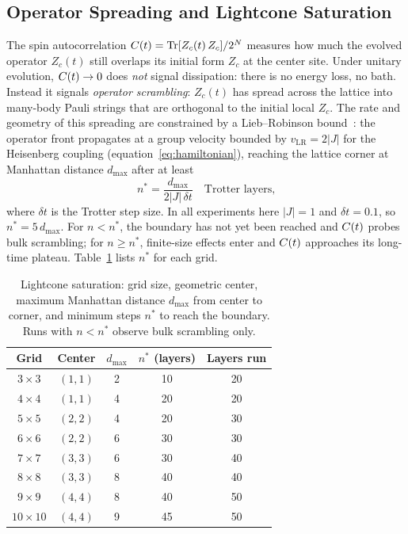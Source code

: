 \subsection{Operator Spreading and Lightcone Saturation}
\label{sec:lightcone}

The spin autocorrelation $C(t) = \mathrm{Tr}[Z_c(t)\,Z_c]/2^N$ measures how
much the evolved operator $Z_c(t)$ still overlaps its initial form $Z_c$ at
the center site.
Under unitary evolution, $C(t) \to 0$ does \emph{not} signal dissipation:
there is no energy loss, no bath.
Instead it signals \emph{operator scrambling}: $Z_c(t)$ has spread across
the lattice into many-body Pauli strings that are orthogonal to the initial
local $Z_c$.
The rate and geometry of this spreading are constrained by a Lieb--Robinson
bound~\citep{liebrobinson}: the operator front propagates at a group velocity
bounded by $v_{\mathrm{LR}} = 2|J|$ for the Heisenberg coupling
(equation~\eqref{eq:hamiltonian}), reaching the lattice corner at Manhattan
distance $d_{\mathrm{max}}$ after at least
\begin{equation}
 n^* = \frac{d_{\mathrm{max}}}{2|J|\,\delta t}
 \quad \text{Trotter layers,}
 \label{eq:nstar}
\end{equation}
where $\delta t$ is the Trotter step size.
In all experiments here $|J| = 1$ and $\delta t = 0.1$, so
$n^* = 5\,d_{\mathrm{max}}$.
For $n < n^*$, the boundary has not yet been reached and $C(t)$ probes
bulk scrambling; for $n \geq n^*$, finite-size effects enter and $C(t)$
approaches its long-time plateau.
Table~\ref{tab:lightcone} lists $n^*$ for each grid.

\begin{table}[ht]
\centering
\caption{Lightcone saturation: grid size, geometric center, maximum Manhattan
 distance $d_{\mathrm{max}}$ from center to corner, and minimum steps $n^*$
 to reach the boundary.
 Runs with $n < n^*$ observe bulk scrambling only.}
\label{tab:lightcone}
\begin{tabular}{ccccc}
\toprule
Grid & Center & $d_{\mathrm{max}}$ & $n^*$ (layers) & Layers run \\
\midrule
$3\times3$ & $(1,1)$ & 2 & 10 & 20 \\
$4\times4$ & $(1,1)$ & 4 & 20 & 20 \\
$5\times5$ & $(2,2)$ & 4 & 20 & 30 \\
$6\times6$ & $(2,2)$ & 6 & 30 & 30 \\
$7\times7$ & $(3,3)$ & 6 & 30 & 40 \\
$8\times8$ & $(3,3)$ & 8 & 40 & 40 \\
$9\times9$ & $(4,4)$ & 8 & 40 & 50 \\
$10\times10$ & $(4,4)$ & 9 & 45 & 50 \\
\bottomrule
\end{tabular}
\end{table}

